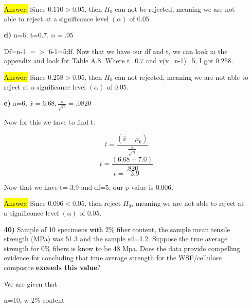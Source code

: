 \documentclass{article}
\begin{document}
\hl{Answer:} Since $0.110>0.05$, then $H_{0}$ can not be rejected, meaning we are not able to reject at a significance level $(\alpha)$ of 0.05. 


\vspace{3mm}

\textbf{d)} n=6, t=0.7, $\alpha=.05$ 

\vspace{2mm}

Df=n-1 $=>$ 6-1=5df. Now that we have our df and t, we can look in the appendix and look for Table A.8. Where t=0.7 and v(v=n-1)=5, I got 0.258. 

\hl{Answer:} Since $0.258>0.05$, then $H_{0}$ can not rejected, meaning we are not able to reject at a significance level $(\alpha)$ of 0.05. 

\vspace{3mm}

\textbf{e)} n=6, $\overline{x}=6.68, \frac{s}{\sqrt{n}}=.0820$

\vspace{2mm}

Now for this we have to find t:

\vspace{2mm}

$$t=\frac{(\overline{x}-\mu_{0})}{ \frac{s}{\sqrt{n}}}$$
$$t=\frac{(6.68-7.0)}{.820}$$
$$t=-3.9$$

\vspace{3mm}

Now that we have t=-3.9 and df=5, our p-value is 0.006. 


\hl{Answer:} Since $0.006<0.05$, then reject $H_{0}$, meaning we are not able to reject at a significance level $(\alpha)$ of 0.05.



\newpage
\textbf{40)} Sample of 10 specimens with 2\% fiber content, the sample mean tensile strength (MPa) was 51.3 and the sample sd=1.2. Suppose the true average strength for 0\% fibers is know to be 48 Mpa. Does the data provide compelling evidence for concluding that true average strength for the WSF/cellulose composite \textbf{exceeds this value}?

\vspace{2mm}

We are given that 

\vspace{2mm}

n=10, w 2\% content
\end{document}
